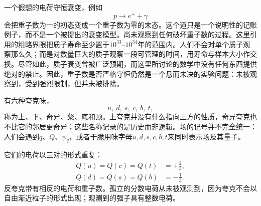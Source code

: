 \begin{classroomqa}
\end{classroomqa}

一个假想的电荷守恒衰变，例如
\begin{equation}
p\longrightarrow e^++\gamma
\end{equation}
会把重子数为一的初态变成一个重子数为零的末态。这个道只是一个说明性的记账例子，而不是一个被提出的衰变模型。尚未观察到任何破坏重子数的过程。这里引用的粗略界限把质子寿命至少置于\(10^{33}\)--\(10^{34}\)年的范围内。人们不会对单个质子观察那么久；而是对数量巨大的质子观察一段可管理的时间，用寿命与样本大小作交换。尽管如此，质子衰变曾被广泛预期，而这里所讨论的数学中没有任何东西提供绝对的禁止。因此，重子数是否严格守恒仍然是一个悬而未决的实验问题：未被观察到，受到强烈限制，但并未被排除。

\begin{classroomqa}
\end{classroomqa}

有六种夸克味，
\begin{equation}
u,\ d,\ s,\ c,\ b,\ t,
\end{equation}
称为上、下、奇异、粲、底和顶。上夸克并没有什么指向上方的性质，奇异夸克也不比它的邻居更奇异；这些名称记录的是历史而非逻辑。场的记号并不完全统一：人们会遇到\(q\)、\(Q\)、\(\psi_q\)，或者干脆用味字母\(u,d,s,c,b,t\)来同时表示场及其量子。

\begin{classroomqa}
\end{classroomqa}

它们的电荷以三对的形式重复：
\begin{equation}
\begin{aligned}
Q(u)=Q(c)=Q(t)&=+\frac23,
\\
Q(d)=Q(s)=Q(b)&=-\frac13.
\end{aligned}
\end{equation}
反夸克带有相反的电荷和重子数。孤立的分数电荷从未被观测到，因为夸克不会以自由渐近粒子的形式出现；观测到的强子具有整数电荷。

